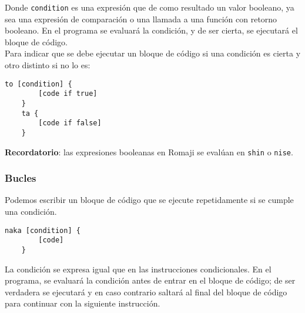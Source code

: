 \documentclass[spanish]{article}
\begin{document}
Donde \texttt{condition} es una expresión que de como resultado un valor booleano, ya sea una expresión de comparación o una llamada a una función con retorno booleano. En el programa se evaluará la condición, y de ser cierta, se ejecutará el bloque de código.\\

Para indicar que se debe ejecutar un bloque de código si una condición es cierta y otro distinto si no lo es:

\begin{lstlisting}[language=Romaji]
    to [condition] {
        [code if true]
    }
    ta {
        [code if false]
    }
\end{lstlisting}

\textbf{Recordatorio}: las expresiones booleanas en Romaji se evalúan en \texttt{shin} o \texttt{nise}.

\subsubsection{Bucles}

Podemos escribir un bloque de código que se ejecute repetidamente si se cumple una condición.

\begin{lstlisting}[language=Romaji]
    naka [condition] {
        [code]
    }
\end{lstlisting}
La condición se expresa igual que en las instrucciones condicionales.
En el programa, se evaluará la condición antes de entrar en el bloque de código; de ser verdadera se ejecutará y en caso contrario saltará al final del bloque de código para continuar con la siguiente instrucción.
\end{document}

